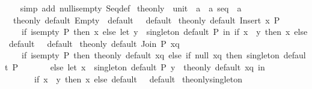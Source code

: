\begin{isabellebody}
%
\isadelimproof
\ \ %
\endisadelimproof
%
\isatagproof
{}\isamarkupfalse%
\ {\isacharparenleft}{\kern0pt}simp\ add{\isacharcolon}{\kern0pt}\ null{\isacharunderscore}{\kern0pt}is{\isacharunderscore}{\kern0pt}empty\ Seq{\isacharunderscore}{\kern0pt}def{\isacharparenright}{\kern0pt}%
\endisatagproof
{\isafoldproof}%
%
\isadelimproof
\isanewline
%
\endisadelimproof
\isanewline
{}\isamarkupfalse%
\ the{\isacharunderscore}{\kern0pt}only\ {\isacharcolon}{\kern0pt}{\isacharcolon}{\kern0pt}\ {\isachardoublequoteopen}{\isacharparenleft}{\kern0pt}unit\ {\isasymRightarrow}\ {\isacharprime}{\kern0pt}a{\isacharparenright}{\kern0pt}\ {\isasymRightarrow}\ {\isacharprime}{\kern0pt}a\ seq\ {\isasymRightarrow}\ {\isacharprime}{\kern0pt}a{\isachardoublequoteclose}\ \isanewline
\ \ {\isachardoublequoteopen}the{\isacharunderscore}{\kern0pt}only\ default\ Empty\ {\isacharequal}{\kern0pt}\ default\ {\isacharparenleft}{\kern0pt}{\isacharparenright}{\kern0pt}{\isachardoublequoteclose}\ \ default\isanewline
{\isacharbar}{\kern0pt}\ {\isachardoublequoteopen}the{\isacharunderscore}{\kern0pt}only\ default\ {\isacharparenleft}{\kern0pt}Insert\ x\ P{\isacharparenright}{\kern0pt}\ {\isacharequal}{\kern0pt}\isanewline
\ \ \ \ {\isacharparenleft}{\kern0pt}if\ is{\isacharunderscore}{\kern0pt}empty\ P\ then\ x\ else\ let\ y\ {\isacharequal}{\kern0pt}\ singleton\ default\ P\ in\ if\ x\ {\isacharequal}{\kern0pt}\ y\ then\ x\ else\ default\ {\isacharparenleft}{\kern0pt}{\isacharparenright}{\kern0pt}{\isacharparenright}{\kern0pt}{\isachardoublequoteclose}\ \ default\isanewline
{\isacharbar}{\kern0pt}\ {\isachardoublequoteopen}the{\isacharunderscore}{\kern0pt}only\ default\ {\isacharparenleft}{\kern0pt}Join\ P\ xq{\isacharparenright}{\kern0pt}\ {\isacharequal}{\kern0pt}\isanewline
\ \ \ \ {\isacharparenleft}{\kern0pt}if\ is{\isacharunderscore}{\kern0pt}empty\ P\ then\ the{\isacharunderscore}{\kern0pt}only\ default\ xq\ else\ if\ null\ xq\ then\ singleton\ default\ P\isanewline
\ \ \ \ \ \ \ else\ let\ x\ {\isacharequal}{\kern0pt}\ singleton\ default\ P{\isacharsemicolon}{\kern0pt}\ y\ {\isacharequal}{\kern0pt}\ the{\isacharunderscore}{\kern0pt}only\ default\ xq\ in\isanewline
\ \ \ \ \ \ \ if\ x\ {\isacharequal}{\kern0pt}\ y\ then\ x\ else\ default\ {\isacharparenleft}{\kern0pt}{\isacharparenright}{\kern0pt}{\isacharparenright}{\kern0pt}{\isachardoublequoteclose}\ \ default\isanewline
\isanewline
{}\isamarkupfalse%
\ the{\isacharunderscore}{\kern0pt}only{\isacharunderscore}{\kern0pt}singleton{\isacharcolon}{\kern0pt}\isanewline

\end{isabellebody}
